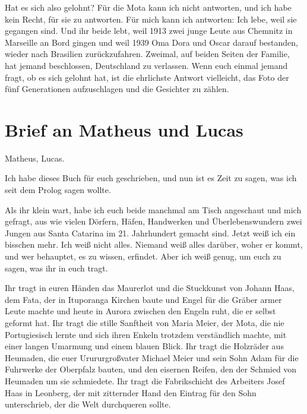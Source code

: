 \documentclass[
  ngerman,
  11pt,
  openany]{book}
\begin{document}
Hat es sich also gelohnt? Für die Mota kann ich nicht antworten, und ich
habe kein Recht, für sie zu antworten. Für mich kann ich antworten: Ich
lebe, weil sie gegangen sind. Und ihr beide lebt, weil 1913 zwei junge
Leute aus Chemnitz in Marseille an Bord gingen und weil 1939 Oma Dora
und Oscar darauf bestanden, wieder nach Brasilien zurückzufahren.
Zweimal, auf beiden Seiten der Familie, hat jemand beschlossen,
Deutschland zu verlassen. Wenn euch einmal jemand fragt, ob es sich
gelohnt hat, ist die ehrlichste Antwort vielleicht, das Foto der fünf
Generationen aufzuschlagen und die Gesichter zu zählen.

\section{Brief an Matheus und Lucas}\label{brief-an-matheus-und-lucas}

Matheus, Lucas.

Ich habe dieses Buch für euch geschrieben, und nun ist es Zeit zu sagen,
was ich seit dem Prolog sagen wollte.

Als ihr klein wart, habe ich euch beide manchmal am Tisch angeschaut und
mich gefragt, aus wie vielen Dörfern, Häfen, Handwerken und
Überlebenswundern zwei Jungen aus Santa Catarina im 21. Jahrhundert
gemacht sind. Jetzt weiß ich ein bisschen mehr. Ich weiß nicht alles.
Niemand weiß alles darüber, woher er kommt, und wer behauptet, es zu
wissen, erfindet. Aber ich weiß genug, um euch zu sagen, was ihr in euch
tragt.

Ihr tragt in euren Händen das Maurerlot und die Stuckkunst von Johann
Haas, dem Fata, der in Ituporanga Kirchen baute und Engel für die Gräber
armer Leute machte und heute in Aurora zwischen den Engeln ruht, die er
selbst geformt hat. Ihr tragt die stille Sanftheit von Maria Meier, der
Mota, die nie Portugiesisch lernte und sich ihren Enkeln trotzdem
verständlich machte, mit einer langen Umarmung und einem blauen Blick.
Ihr tragt die Holzräder aus Heumaden, die euer Urururgroßvater Michael
Meier und sein Sohn Adam für die Fuhrwerke der Oberpfalz bauten, und den
eisernen Reifen, den der Schmied von Heumaden um sie schmiedete. Ihr
tragt die Fabrikschicht des Arbeiters Josef Haas in Leonberg, der mit
zitternder Hand den Eintrag für den Sohn unterschrieb, der die Welt
durchqueren sollte.
\end{document}
